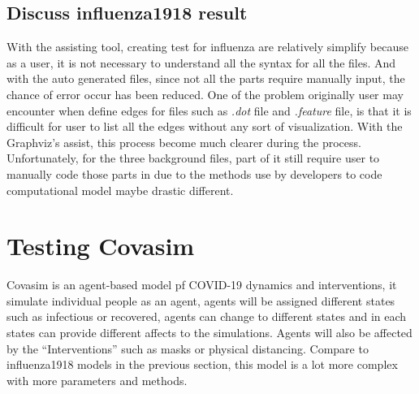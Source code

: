 \subsection{Discuss influenza1918 result}
With the assisting tool, creating test for influenza are relatively simplify because as a user, it is not necessary to understand all the syntax for all the files. And with the auto generated files, since not all the parts require manually input, the chance of error occur has been reduced. One of the problem originally user may encounter when define edges for files such as \textsl{.dot} file and \textsl{.feature} file, is that it is difficult for user to list all the edges without any sort of visualization. With the Graphviz’s assist, this process become much clearer during the process. Unfortunately, for the three background files, part of it still require user to manually code those parts in due to the methods use by developers to code computational model maybe drastic different.

\section{Testing Covasim}
Covasim is an agent-based model pf COVID-19 dynamics and interventions, it simulate individual people as an agent, agents will be assigned different states such as infectious or recovered, agents can change to different states and in each states can provide different affects to the simulations. Agents will also be affected by the “Interventions” such as masks or physical distancing. Compare to influenza1918 models in the previous section, this model is a lot more complex with more parameters and methods. 

